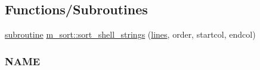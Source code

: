 \subsection*{Functions/\+Subroutines}
\begin{DoxyCompactItemize}
\item 
\hyperlink{M__stopwatch_83_8txt_acfbcff50169d691ff02d4a123ed70482}{subroutine} \hyperlink{namespacem__sort_a067046800385d8d22a4bbe8d37ce07ed}{m\+\_\+sort\+::sort\+\_\+shell\+\_\+strings} (\hyperlink{ufpp__overview_81_8txt_a38547e77f801e6266edc9bcd56b63a00}{lines}, order, startcol, endcol)
\begin{DoxyCompactList}\small\item\em \subsubsection*{N\+A\+ME}


\end{DoxyCompactList}
\end{DoxyCompactItemize}
